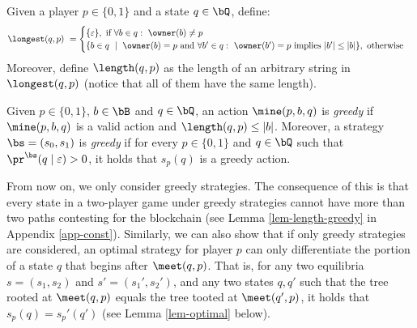 Given a player $p \in \{0,1\}$ and a state $q \in \bQ$, define:
$$
\longest(q,p) \ =
\begin{cases}
\{\varepsilon\}, \text{ if } \forall b\in q:\ \owner(b)\neq p\\
\{b\in q \ \mid \ \owner(b)=p \text{ and } \forall b'\in q:\ \owner(b')=p \text{ implies } |b'|\leq |b|\}, \text{ otherwise}
\end{cases}
$$
Moreover, define $\length(q,p)$ as the length of an arbitrary string in $\longest(q,p)$ (notice that all of them have the same length).
\begin{mydef}\label{def-greedy}
Given $p \in \{0,1\}$, $b \in \bB$ and $q \in \bQ$,  an action $\mine(p,b,q)$ is {\em greedy} if $\mine(p,b,q)$ is a valid action and $\length(q,p) \leq |b|$.
%
Moreover, a strategy $\bs = (s_0, s_1)$ is {\em greedy} if for every $p \in \{0,1\}$ and  $q \in \bQ$ such that $\pr^{\bs}(q \mid \varepsilon) > 0$, it holds that $s_p(q)$ is a greedy action.
\end{mydef}
From now on, we only consider greedy strategies. 
%
The consequence of this is that every state in a two-player game under greedy strategies cannot have more than two paths contesting for the blockchain (see Lemma \ref{lem-length-greedy} in Appendix \ref{app-const}). %
%
%
%
Similarly, we can also show that if only greedy strategies are considered, an optimal strategy for player $p$ can only differentiate the portion of a state $q$ that begins after $\meet(q,p)$. That is, for any two equilibria $s=(s_1,s_2)$ and $s'=(s_1',s_2')$, and any two states $q,q'$ such that the tree rooted at $\meet(q,p)$ equals the tree tooted at $\meet(q',p)$, it holds that $s_p(q)=s_p'(q')$ (see Lemma \ref{lem-optimal} below).




